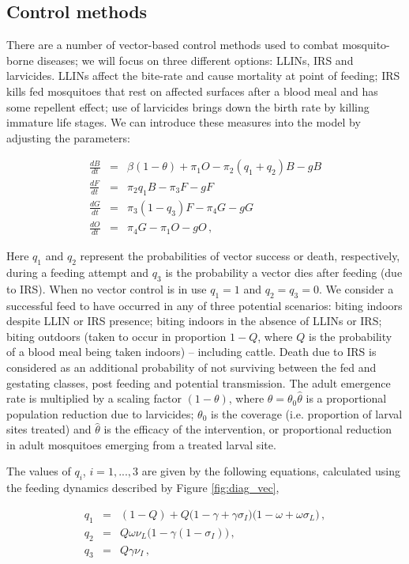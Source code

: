 \subsection{Control methods}

There are a number of vector-based control methods used to combat mosquito-borne diseases; we will focus on three different options: LLINs, IRS and larvicides. LLINs affect the bite-rate and cause mortality at point of feeding; IRS kills fed mosquitoes that rest on affected surfaces after a blood meal and has some repellent effect; use of larvicides brings down the birth rate by killing immature life stages. We can introduce these measures into the model by adjusting the parameters:

\begin{eqnarray}
\frac{dB}{dt} &=& \beta(1-\theta) + \pi_1O - \pi_2(q_1+q_2)B -g B \\
\frac{dF}{dt} &=& \pi_2q_1B - \pi_3 F - gF \\
\frac{dG}{dt} &=& \pi_3(1-q_3)F - \pi_4G - g G \\
\frac{dO}{dt} &=& \pi_4G - \pi_1O - g O \,,
\label{eqn:ODE}
\end{eqnarray}

Here $q_1$ and $q_2$ represent the probabilities of vector success or death, respectively, during a feeding attempt and $q_3$ is the probability a vector dies after feeding (due to IRS). When no vector control is in use $q_1=1$ and $q_2=q_3=0$. We consider a successful feed to have occurred in any of three potential scenarios: biting indoors despite LLIN or IRS presence; biting indoors in the absence of LLINs or IRS; biting outdoors (taken to occur in proportion $1-Q$, where $Q$ is the probability of a blood meal being taken indoors) -- including cattle. Death due to IRS is considered as an additional probability of not surviving between the fed and gestating classes, post feeding and potential transmission. The adult emergence rate is multiplied by a scaling factor $(1-\theta)$, where $\theta=\theta_0\hat{\theta}$ is a proportional population reduction due to larvicides; $\theta_0$ is the coverage (i.e. proportion of larval sites treated) and $\hat{\theta}$ is the efficacy of the intervention, or proportional reduction in adult mosquitoes emerging from a treated larval site. 

The values of $q_i$, $i=1,...,3$ are given by the following equations, calculated using the feeding dynamics described by Figure \ref{fig:diag_vec},

\begin{eqnarray}
q_1 &=& (1-Q) + Q\big(1-\gamma+\gamma\sigma_I\big)\big(1-\omega + \omega\sigma_L\big) \,, \\
q_2 &=& Q\omega\nu_L\big(1-\gamma(1-\sigma_I)\big) \,, \\
q_3 &=& Q\gamma\nu_I \,,
\end{eqnarray}

